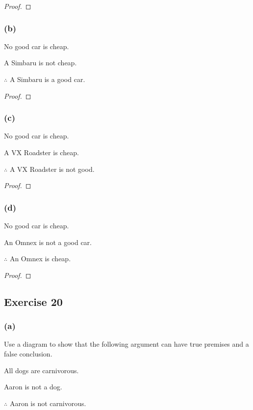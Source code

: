 \documentclass[14pt]{extarticle}
\begin{document}
\begin{proof}

\end{proof}

\subsubsection{(b)}
No good car is cheap.

A Simbaru is not cheap.

$\therefore$ A Simbaru is a good car.

\begin{proof}

\end{proof}

\subsubsection{(c)}
No good car is cheap.

A VX Roadster is cheap.

$\therefore$ A VX Roadster is not good.

\begin{proof}

\end{proof}

\subsubsection{(d)}
No good car is cheap.

An Omnex is not a good car.

$\therefore$ An Omnex is cheap.

\begin{proof}

\end{proof}

\subsection{Exercise 20}

\subsubsection{(a)}
Use a diagram to show that the following argument can have true premises and a false conclusion.

All dogs are carnivorous.

Aaron is not a dog.

$\therefore$ Aaron is not carnivorous.
\end{document}

